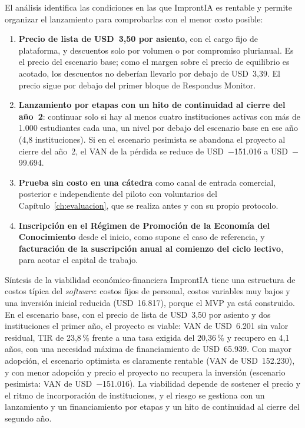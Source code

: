 El análisis identifica las condiciones en las que ImprontIA es rentable y permite organizar el lanzamiento para comprobarlas con el menor costo posible:

\begin{enumerate}
    \item \textbf{Precio de lista de USD~3,50 por asiento}, con el cargo fijo de plataforma, y descuentos solo por volumen o por compromiso plurianual. Es el precio del escenario base; como el margen sobre el precio de equilibrio es acotado, los descuentos no deberían llevarlo por debajo de USD~3,39. El precio sigue por debajo del primer bloque de Respondus Monitor.
    \item \textbf{Lanzamiento por etapas con un hito de continuidad al cierre del año~2}: continuar solo si hay al menos cuatro instituciones activas con más de 1.000 estudiantes cada una, un nivel por debajo del escenario base en ese año (4,8 instituciones). Si en el escenario pesimista se abandona el proyecto al cierre del año~2, el VAN de la pérdida se reduce de USD~$-$151.016 a USD~$-$99.694.
    \item \textbf{Prueba sin costo en una cátedra} como canal de entrada comercial, posterior e independiente del piloto con voluntarios del Capítulo~\ref{ch:evaluacion}, que se realiza antes y con su propio protocolo.
    \item \textbf{Inscripción en el Régimen de Promoción de la Economía del Conocimiento} desde el inicio, como supone el caso de referencia, y \textbf{facturación de la suscripción anual al comienzo del ciclo lectivo}, para acotar el capital de trabajo.
\end{enumerate}

\begin{keyfinding}{Síntesis de la viabilidad económico-financiera}
ImprontIA tiene una estructura de costos típica del \textit{software}: costos fijos de personal, costos variables muy bajos y una inversión inicial reducida (USD~16.817), porque el MVP ya está construido. En el escenario base, con el precio de lista de USD~3,50 por asiento y dos instituciones el primer año, el proyecto es viable: VAN de USD~6.201 sin valor residual, TIR de 23,8\,\% frente a una tasa exigida del 20,36\,\% y recupero en 4,1 años, con una necesidad máxima de financiamiento de USD~65.939. Con mayor adopción, el escenario optimista es claramente rentable (VAN de USD~152.230), y con menor adopción y precio el proyecto no recupera la inversión (escenario pesimista: VAN de USD~$-$151.016). La viabilidad depende de sostener el precio y el ritmo de incorporación de instituciones, y el riesgo se gestiona con un lanzamiento y un financiamiento por etapas y un hito de continuidad al cierre del segundo año.
\end{keyfinding}

